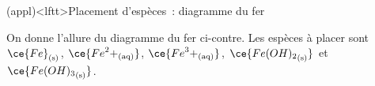 \documentclass[../../main/main.tex]{subfiles}
\begin{document}
\begin{tcb*}[breakable](appl)<lftt>{Placement d'espèces~: diagramme du fer}
  \noindent
  \begin{minipage}[c]{.5\linewidth}
      On donne l'allure du diagramme du fer ci-contre. Les espèces à placer sont
    $\ce{Fe}_{\rm(s)}$, $\ce{{Fe}^2+_{\rm(aq)}}$, $\ce{{Fe}^3+_{\rm(aq)}}$,
    $\ce{{Fe(OH)_2}_{\rm(s)}}$ et $\ce{{Fe(OH)_3}_{\rm(s)}}$.
  \end{minipage}
  \begin{minipage}[c]{.5\linewidth}
    \vspace{0pt}
    \begin{center}
\end{center}
\end{minipage}
\end{tcb*}
\end{document}
